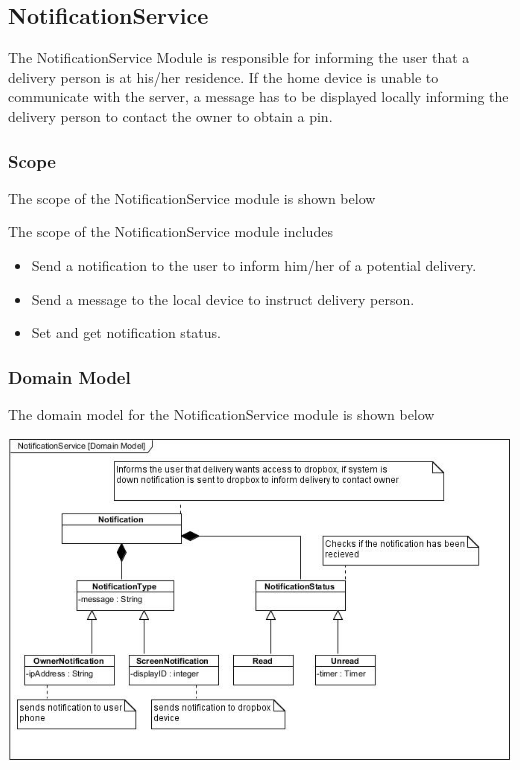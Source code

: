 \documentclass[a4paper,12pt]{article}
\begin{document}
	\subsection{NotificationService}
	The NotificationService Module is responsible for informing the user that a delivery person is at his/her residence. If the home device is unable to communicate with the server, a message has to be displayed locally informing the delivery person to contact the owner to obtain a pin. 
	
	\subsubsection{Scope}
	The scope of the NotificationService module is shown below
	
	
	{\noindent}The scope of the NotificationService module includes
	\begin{itemize}
		\item Send a notification to the user to inform him/her of a potential delivery.
		\item Send a message to the local device to instruct delivery person.
		\item Set and get notification status.
	\end{itemize}
	
	\subsubsection{Domain Model}
	The domain model for the NotificationService module is shown below
	
	\includegraphics[width=1\textwidth]{./Pictures/UML/NotificationServiceDomain.jpg}\\[0cm]	
	
\end{document}
